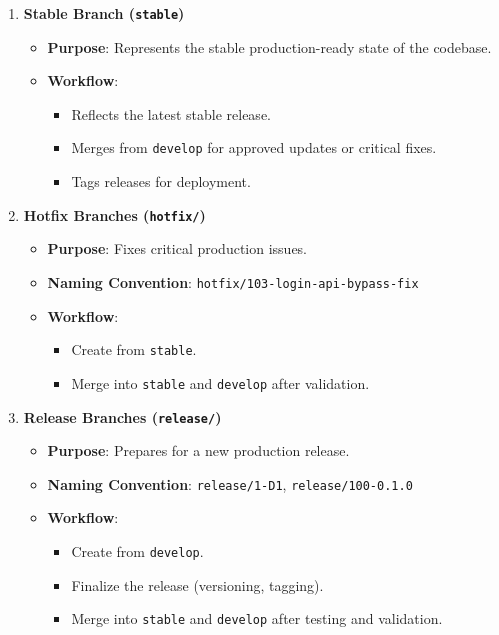 \begin{enumerate}
	\item \textbf{Stable Branch (\texttt{stable})}
	\begin{itemize}
		\item \textbf{Purpose}: Represents the stable production-ready state of the codebase.
		\item \textbf{Workflow}:
		\begin{itemize}
			\item Reflects the latest stable release.
			\item Merges from \texttt{develop} for approved updates or critical fixes.
			\item Tags releases for deployment.
		\end{itemize}
	\end{itemize}
	
	\item \textbf{Hotfix Branches (\texttt{hotfix/})}
	\begin{itemize}
		\item \textbf{Purpose}: Fixes critical production issues.
		\item \textbf{Naming Convention}: \texttt{hotfix/103-login-api-bypass-fix}
		\item \textbf{Workflow}:
		\begin{itemize}
			\item Create from \texttt{stable}.
			\item Merge into \texttt{stable} and \texttt{develop} after validation.
		\end{itemize}
	\end{itemize}
	
	\item \textbf{Release Branches (\texttt{release/})}
	\begin{itemize}
		\item \textbf{Purpose}: Prepares for a new production release.
		\item \textbf{Naming Convention}: \texttt{release/1-D1}, \texttt{release/100-0.1.0}
		\item \textbf{Workflow}:
		\begin{itemize}
			\item Create from \texttt{develop}.
			\item Finalize the release (versioning, tagging).
			\item Merge into \texttt{stable} and \texttt{develop} after testing and validation.
		\end{itemize}
	\end{itemize}
	

\end{enumerate}
